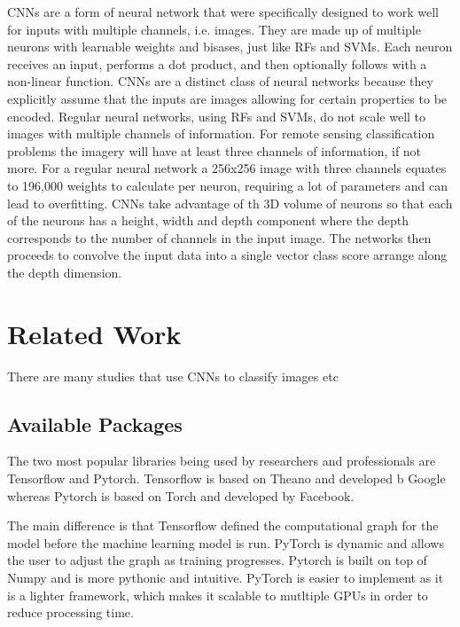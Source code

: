  \par
 CNNs are a form of neural network that were specifically designed to work well for inputs with multiple channels, i.e. images. They are made up of multiple neurons with learnable weights and bisases, just like RFs and SVMs. Each neuron receives an input, performs a dot product, and then optionally follows with a non-linear function. CNNs are a distinct class of neural networks because they explicitly assume that the inputs are images allowing for certain properties to be encoded. Regular neural networks, using RFs and SVMs, do not scale well to images with multiple channels of information. For remote sensing classification problems the imagery will have at least three channels of information, if not more. For a regular neural network a 256x256 image with three channels equates to 196,000 weights to calculate per neuron, requiring a lot of parameters and can lead to overfitting. CNNs take advantage of th 3D volume of neurons so that each of the neurons has a height, width and depth component where the depth corresponds to the number of channels in the input image. The networks then proceeds to convolve the input data into a single vector class score arrange along the depth dimension. 

\section{Related Work}
There are many studies that use CNNs to classify images etc
\subsection*{Available Packages}
The two most popular libraries being used by researchers and professionals are Tensorflow and Pytorch. Tensorflow is based on Theano and developed b Google whereas Pytorch is based on Torch and developed by Facebook.
\par
The main difference is that Tensorflow defined the computational graph for the model before the machine learning model is run. PyTorch is dynamic and allows the user to adjust the graph as training progresses. Pytorch is built on top of Numpy and is more pythonic and intuitive. PyTorch is easier to implement as it is a lighter framework, which makes it scalable to mutltiple GPUs in order to reduce processing time.